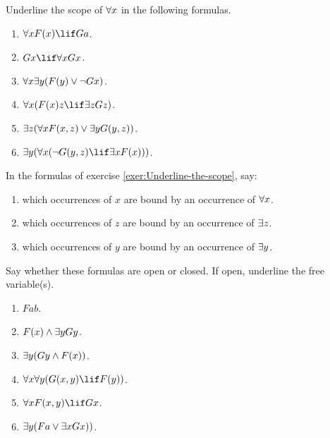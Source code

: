 \documentclass[../../../../include/open-logic-section]{subfiles}
\begin{document}


\begin{prob}[Scope]
Underline the scope of $\lforall x$ in the following
formulas.\label{exer:Underline-the-scope}
\begin{enumerate}
\item $\lforall x\Atom{F}{x}\lif Ga$. 
\item $Gx\lif\lforall xGx$. 
\item $\lforall x\lexists y(\Atom{F}{y}\lor\lnot Gx)$. 
\item $\lforall x(\Atom{F}{x}z\lif\lexists zGz)$. 
\item $\lexists z(\lforall x\Atom{F}{x,z}\lor\lexists y\Atom{G}{y,z})$. 
\item $\lexists y(\lforall x(\lnot \Atom{G}{y,z}\lif\lexists x\Atom{F}{x}))$. 
\end{enumerate}
\end{prob}

\begin{prob}[Binding]
In the formulas of exercise \ref{exer:Underline-the-scope},
say:
\begin{enumerate}
\item which occurrences of $x$ are bound by an occurrence of $\lforall x$. 
\item which occurrences of $z$ are bound by an occurrence of $\lexists z$. 
\item which occurrences of $y$ are bound by an occurrence of $\lexists y$. 
\end{enumerate}
\end{prob}

\begin{prob}
Say whether these formulas are open
or closed. If open, underline the free variable(s).
\begin{enumerate}
\item $Fab$. 
\item $\Atom{F}{x}\land\lexists yGy$. 
\item $\lexists y(Gy\land \Atom{F}{x})$. 
\item $\lforall x\lforall y(\Atom{G}{x,y}\lif \Atom{F}{y})$. 
\item $\lforall x\Atom{F}{x,y}\lif Gx$. 
\item $\lexists y(Fa\lor\lexists xGx))$.
\end{enumerate}
\end{prob}
\end{document}
